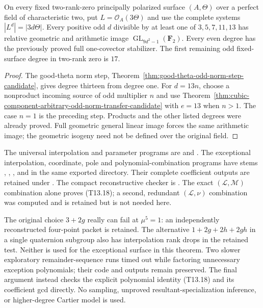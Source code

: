 \begin{corollary}
\label{cor:f0-odd-multiples-thirteen-candidate}
On every fixed two-rank-zero principally polarized surface $(A,\Theta)$
over a perfect field of characteristic two, put
$L=\mathcal O_A(3\Theta)$ and use the complete systems
$|L^d|=|3d\Theta|$. Every positive odd $d$ divisible by at least one
of $3,5,7,11,13$ has relative geometric and arithmetic image
$\operatorname{GL}_{9d^2-1}(\mathbf F_2)$. Every even degree has
the previously proved full one-covector stabilizer. The first
remaining odd fixed-surface degree in two-rank zero is $17$.
\end{corollary}
\begin{proof}
The good-theta norm step, Theorem~\ref{thm:good-theta-odd-norm-step-candidate},
gives degree thirteen from degree one. For $d=13n$, choose a
nonproduct incoming source of odd multiplier $n$ and use
Theorem~\ref{thm:cubic-component-arbitrary-odd-norm-transfer-candidate}
with $e=13$ when $n>1$. The case $n=1$ is the preceding step.
Products and the other listed degrees were already proved. Full
geometric general linear image forces the same arithmetic image;
the geometric isogeny need not be defined over the original field.
\end{proof}

\begin{remark}
\label{rem:uniform-thirteen-verification-scope-candidate}
The universal interpolation and parameter programs are
 and
.
The exceptional interpolation, coordinate, pole and polynomial-combination
programs have stems ,
,
, and
 in the same exported
directory. Their complete coefficient outputs are retained under
.
The compact reconstructive checker is
.
The exact $(\mathcal L,\mathcal M)$ combination alone proves (T13.18);
a second, redundant $(\mathcal L,\nu)$ combination was computed
and is retained but is not needed here.

The original choice $3+2g$ really can fail at $\mu^5=1$:
an independently reconstructed four-point packet is retained.
The alternative $1+2g+2h+2gh$ in a single quaternion subgroup also
has interpolation rank drops in the retained test. Neither is used
for the exceptional surface in this theorem. Two slower exploratory
remainder-sequence runs timed out while factoring unnecessary
exception polynomials; their code and outputs remain preserved.
The final argument instead checks the explicit polynomial identity
(T13.18) and its coefficient gcd directly. No sampling, unproved
resultant-specialization inference, or higher-degree Cartier model
is used.
\end{remark}
